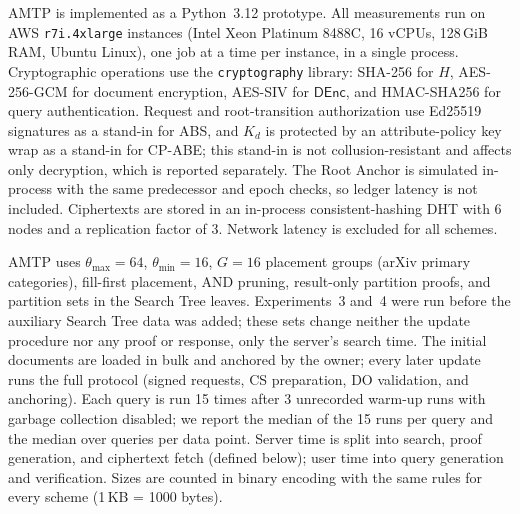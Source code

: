 

AMTP is implemented as a Python~3.12 prototype. All measurements run on AWS \texttt{r7i.4xlarge}
instances (Intel Xeon Platinum 8488C, 16 vCPUs, 128\,GiB RAM, Ubuntu Linux), one job at a time per
instance, in a single process. Cryptographic operations use the \texttt{cryptography} library:
SHA-256 for $H$, AES-256-GCM for document encryption, AES-SIV for $\mathsf{DEnc}$, and HMAC-SHA256 for
query authentication. Request and root-transition authorization use Ed25519 signatures as a stand-in
for ABS, and $K_d$ is protected by an attribute-policy key wrap as a stand-in for CP-ABE; this stand-in
is not collusion-resistant and affects only decryption, which is reported separately. The Root Anchor
is simulated in-process with the same predecessor and epoch checks, so ledger latency is not included.
Ciphertexts are stored in an in-process consistent-hashing DHT with 6 nodes and a replication factor
of 3. Network latency is excluded for all schemes.

AMTP uses $\theta_{\max} = 64$, $\theta_{\min} = 16$, $G = 16$ placement groups (arXiv primary
categories), fill-first placement, AND pruning, result-only partition proofs, and partition sets in the
Search Tree leaves.
Experiments~3 and~4 were run before the auxiliary Search Tree data was added;
these sets change neither the update procedure nor any proof or response, only the server's search time.
The initial documents are loaded in bulk and anchored by the owner; every later update runs the full protocol (signed
requests, CS preparation, DO validation, and anchoring). Each query is run 15 times after 3 unrecorded
warm-up runs with garbage collection disabled; we report the median of the 15 runs per query and the
median over queries per data point. Server time is split into search, proof generation, and ciphertext
fetch (defined below); user time into query generation and verification. Sizes are
counted in binary encoding with the same rules for every scheme (1\,KB = 1000 bytes).

